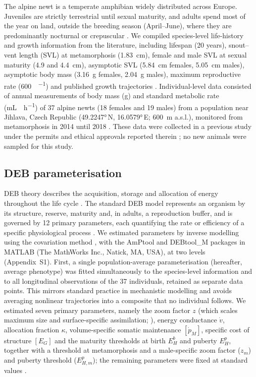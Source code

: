 \documentclass[12pt]{article}
\begin{document}
The alpine newt is a temperate amphibian widely distributed across Europe. Juveniles are strictly terrestrial until sexual maturity, and adults spend most of the year on land, outside the breeding season (April--June), where they are predominantly nocturnal or crepuscular \parencite{denoel2004,rocek2003}. We compiled species-level life-history and growth information from the literature, including lifespan (20 years), snout--vent length (SVL) at metamorphosis (\qty{1.83}{\cm}), female and male SVL at sexual maturity (4.9 and \qty{4.4}{\cm}), asymptotic SVL (\qty{5.84}{\cm} females, \qty{5.05}{\cm} males), asymptotic body mass (\qty{3.16}{\g} females, \qty{2.04}{\g} males), maximum reproductive rate (\qty{600}{\eggs\per\year}) and published growth trajectories \parencite{gvozdik2017,miaud2000a}. Individual-level data consisted of annual measurements of body mass (\si{\gram}) and standard metabolic rate (\si{\milli\liter\Otwo\per\hour}) of 37 alpine newts (18 females and 19 males) from a population near Jihlava, Czech Republic (\ang{49.2247}\,N, \ang{16.0579}\,E; \qty{600}{m} a.s.l.), monitored from metamorphosis in 2014 until 2018 \parencite{baskiera2021}. These data were collected in a previous study under the permits and ethical approvals reported therein \parencite{baskiera2021}; no new animals were sampled for this study.

\subsection{DEB parameterisation}

DEB theory describes the acquisition, storage and allocation of energy throughout the life cycle \parencite{kooijman2010}. The standard DEB model represents an organism by its structure, reserve, maturity and, in adults, a reproduction buffer, and is governed by 12 primary parameters, each quantifying the rate or efficiency of a specific physiological process \parencite{kooijman2010,marques2018}. We estimated parameters by inverse modelling using the covariation method \parencite{lika2011,marques2018}, with the AmPtool and DEBtool\_M packages in MATLAB (The MathWorks Inc., Natick, MA, USA), at two levels (Appendix~S1). First, a single population-average parameterisation (hereafter, average phenotype) was fitted simultaneously to the species-level information and to all longitudinal observations of the 37 individuals, retained as separate data points. This mirrors standard practice in mechanistic modelling and avoids averaging nonlinear trajectories into a composite that no individual follows. We estimated seven primary parameters, namely the zoom factor $z$ (which scales maximum size and surface-specific assimilation; \cite{sousa2008}), energy conductance $\dot{v}$, allocation fraction $\kappa$, volume-specific somatic maintenance $[\dot{p}_M]$, specific cost of structure $[E_G]$ and the maturity thresholds at birth $E_H^b$ and puberty $E_H^p$, together with a threshold at metamorphosis and a male-specific zoom factor ($z_m$) and puberty threshold ($E_{H,m}^p$); the remaining parameters were fixed at standard values \parencite{kooijman2010,kearney2013}.
\end{document}
